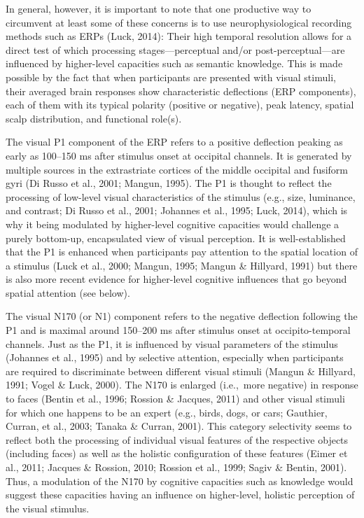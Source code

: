 \documentclass[
  english,
  doc,12pt,twoside,floatsintext]{apa7}
\begin{document}
In general, however, it is important to note that one productive way to circumvent at least some of these concerns is to use neurophysiological recording methods such as ERPs (Luck, 2014): Their high temporal resolution allows for a direct test of which processing stages---perceptual and/or post-perceptual---are influenced by higher-level capacities such as semantic knowledge. This is made possible by the fact that when participants are presented with visual stimuli, their averaged brain responses show characteristic deflections (ERP components), each of them with its typical polarity (positive or negative), peak latency, spatial scalp distribution, and functional role(s).

The visual P1 component of the ERP refers to a positive deflection peaking as early as 100--150 ms after stimulus onset at occipital channels. It is generated by multiple sources in the extrastriate cortices of the middle occipital and fusiform gyri (Di Russo et al., 2001; Mangun, 1995). The P1 is thought to reflect the processing of low-level visual characteristics of the stimulus (e.g., size, luminance, and contrast; Di Russo et al., 2001; Johannes et al., 1995; Luck, 2014), which is why it being modulated by higher-level cognitive capacities would challenge a purely bottom-up, encapsulated view of visual perception. It is well-established that the P1 is enhanced when participants pay attention to the spatial location of a stimulus (Luck et al., 2000; Mangun, 1995; Mangun \& Hillyard, 1991) but there is also more recent evidence for higher-level cognitive influences that go beyond spatial attention (see below).

The visual N170 (or N1) component refers to the negative deflection following the P1 and is maximal around 150--200 ms after stimulus onset at occipito-temporal channels. Just as the P1, it is influenced by visual parameters of the stimulus (Johannes et al., 1995) and by selective attention, especially when participants are required to discriminate between different visual stimuli (Mangun \& Hillyard, 1991; Vogel \& Luck, 2000). The N170 is enlarged (i.e.,~more negative) in response to faces (Bentin et al., 1996; Rossion \& Jacques, 2011) and other visual stimuli for which one happens to be an expert (e.g., birds, dogs, or cars; Gauthier, Curran, et al., 2003; Tanaka \& Curran, 2001). This category selectivity seems to reflect both the processing of individual visual features of the respective objects (including faces) as well as the holistic configuration of these features (Eimer et al., 2011; Jacques \& Rossion, 2010; Rossion et al., 1999; Sagiv \& Bentin, 2001). Thus, a modulation of the N170 by cognitive capacities such as knowledge would suggest these capacities having an influence on higher-level, holistic perception of the visual stimulus.
\end{document}
